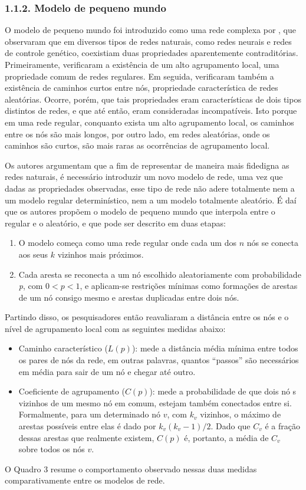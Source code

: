 \documentclass[12pt,oneside,a4paper,brazil,sumario=tradicional]{abntex2}
\begin{document}
\subsubsection*{1.1.2. Modelo de pequeno mundo}
O modelo de pequeno mundo foi introduzido como uma rede complexa por , que observaram que em diversos tipos de redes naturais, como redes neurais e redes de controle genético, coexistiam duas propriedades aparentemente contraditórias. Primeiramente, verificaram a existência de um alto agrupamento local, uma propriedade comum de redes regulares. Em seguida, verificaram também a existência de caminhos curtos entre nós, propriedade característica de redes aleatórias. Ocorre, porém, que tais propriedades eram características de dois tipos distintos de redes, e que até então, eram consideradas incompatíveis. Isto porque em uma rede regular, conquanto exista um alto agrupamento local, os caminhos entre os nós são mais longos, por outro lado, em redes aleatórias, onde os caminhos são curtos, são mais raras as ocorrências de agrupamento local.

Os autores argumentam que a fim de representar de maneira mais fidedigna as redes naturais, é necessário introduzir um novo modelo de rede, uma vez que dadas as propriedades observadas, esse tipo de rede não adere totalmente nem a um modelo regular determinístico, nem a um modelo totalmente aleatório. É daí que os autores propõem o modelo de pequeno mundo que interpola entre o regular e o aleatório, e que pode ser descrito em duas etapas:

\begin{enumerate}
  \item O modelo começa como uma rede regular onde cada um dos $n$ nós se conecta aos seus $k$ vizinhos mais próximos.
  \item Cada aresta se reconecta a um nó escolhido aleatoriamente com probabilidade \textit{p}, com $0 < p < 1$, e aplicam-se restrições mínimas como formações de arestas de um nó consigo mesmo e arestas duplicadas entre dois nós.
\end{enumerate}
Partindo disso, os pesquisadores então reavaliaram a distância entre os nós e o nível de agrupamento local com as seguintes medidas abaixo:

\begin{itemize}
  \item Caminho característico ($L(p)$): mede a distância média mínima entre todos os pares de nós da rede, em outras palavras, quantos “passos” são necessários em média para sair de um nó e chegar até outro.
  \item Coeficiente de agrupamento ($C(p)$): mede a probabilidade de que dois nó s vizinhos de um mesmo nó  em comum, estejam também conectados entre si. Formalmente, para um determinado nó  $v$, com $k_{v}$ vizinhos, o máximo de arestas possíveis entre elas é dado por $k_{v}(k_{v}-1)/2$. Dado que $C_{v}$ é a fração dessas arestas que realmente existem, $C(p)$ é, portanto, a média de $C_{v}$ sobre todos os nós $v$.
\end{itemize}
O Quadro 3 resume o comportamento observado nessas duas medidas comparativamente entre os modelos de rede.
\end{document}
